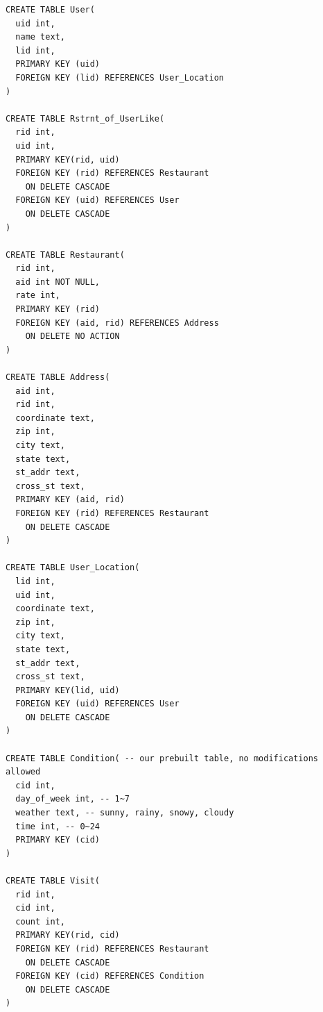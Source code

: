 \documentclass[10pt]{article}
\begin{document}
\begin{verbatim}
CREATE TABLE User(
  uid int,
  name text,
  lid int,
  PRIMARY KEY (uid)
  FOREIGN KEY (lid) REFERENCES User_Location
)

CREATE TABLE Rstrnt_of_UserLike(
  rid int,
  uid int,
  PRIMARY KEY(rid, uid)
  FOREIGN KEY (rid) REFERENCES Restaurant 
    ON DELETE CASCADE
  FOREIGN KEY (uid) REFERENCES User
    ON DELETE CASCADE
)

CREATE TABLE Restaurant(
  rid int,
  aid int NOT NULL, 
  rate int,
  PRIMARY KEY (rid)
  FOREIGN KEY (aid, rid) REFERENCES Address
    ON DELETE NO ACTION
)

CREATE TABLE Address(
  aid int,
  rid int,
  coordinate text,
  zip int,
  city text,
  state text,
  st_addr text,
  cross_st text,
  PRIMARY KEY (aid, rid)
  FOREIGN KEY (rid) REFERENCES Restaurant
    ON DELETE CASCADE
)

CREATE TABLE User_Location(
  lid int,
  uid int,
  coordinate text,
  zip int,
  city text,
  state text,
  st_addr text,
  cross_st text,
  PRIMARY KEY(lid, uid)
  FOREIGN KEY (uid) REFERENCES User
    ON DELETE CASCADE
)

CREATE TABLE Condition( -- our prebuilt table, no modifications allowed
  cid int,
  day_of_week int, -- 1~7
  weather text, -- sunny, rainy, snowy, cloudy
  time int, -- 0~24
  PRIMARY KEY (cid)
)

CREATE TABLE Visit(
  rid int,
  cid int,
  count int,
  PRIMARY KEY(rid, cid)
  FOREIGN KEY (rid) REFERENCES Restaurant
    ON DELETE CASCADE
  FOREIGN KEY (cid) REFERENCES Condition
    ON DELETE CASCADE
)
\end{verbatim}
\end{document}
